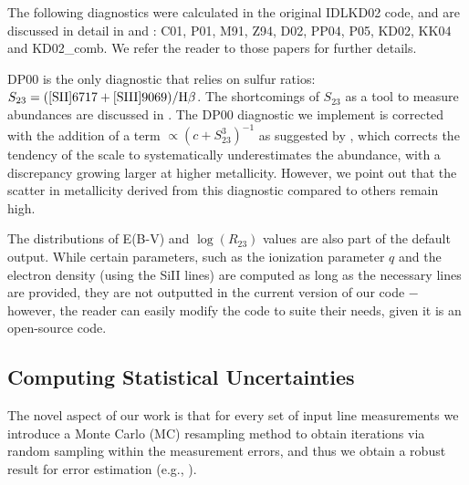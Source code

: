 \documentclass{emulateapj}
\begin{document}
The following diagnostics were calculated in the original IDLKD02 code, and are discussed in detail in \citet{kewley02} and \citet{kewley08}: C01, P01, M91, Z94, D02, PP04, P05, KD02, KK04 and KD02\_comb. We refer the reader to those papers for further details.

DP00 is the only diagnostic that relies on sulfur ratios: $ S_{23}= {\rm ( [SII]6717+[SIII]9069) } / {\rm H}\beta $. The shortcomings of $S_{23}$ as a tool to measure abundances are discussed in \citet{kewley02}.
The DP00 diagnostic we implement is corrected with the addition of a term $\propto (c+S_{23}^3)^{-1}$ as suggested by \citet{kewley02}, which corrects the tendency of the scale to systematically underestimates the abundance, with a discrepancy growing larger at higher metallicity. However, we point out that the scatter in metallicity derived from this diagnostic compared to others remain high. 

The distributions of E(B-V) and $\log(R_{23})$ values are also part of the default output. While certain parameters, such as the ionization parameter $q$ and the electron density (using the SiII lines) are computed as long as the necessary lines are provided, they are not outputted in the current version of our code $-$ however, the reader can easily modify the code to suite their needs, given it is an open-source code.



\subsection{Computing Statistical Uncertainties}\label{sec:uncert}
The novel aspect of our work is that for every set of input line measurements we introduce a Monte Carlo (MC) resampling method to obtain iterations via random sampling within the measurement errors, and thus we obtain a robust result for error estimation (e.g., \citealt{efron79,hastie09,andrae10}). 
\end{document}

